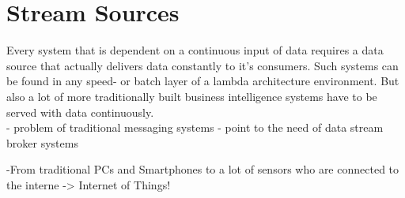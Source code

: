 \section{Stream Sources}
Every system that is dependent on a continuous input of data requires a data
source that actually delivers data constantly to it's consumers. Such systems
can be found in any speed- or batch layer of a lambda architecture environment. 
But also a lot of more traditionally built business intelligence systems have to be
served with data continuously.
\\
- problem of traditional messaging systems
- point to the need of data stream broker systems


-From traditional PCs and Smartphones to a lot of sensors who are connected to
the interne -> Internet of Things!




